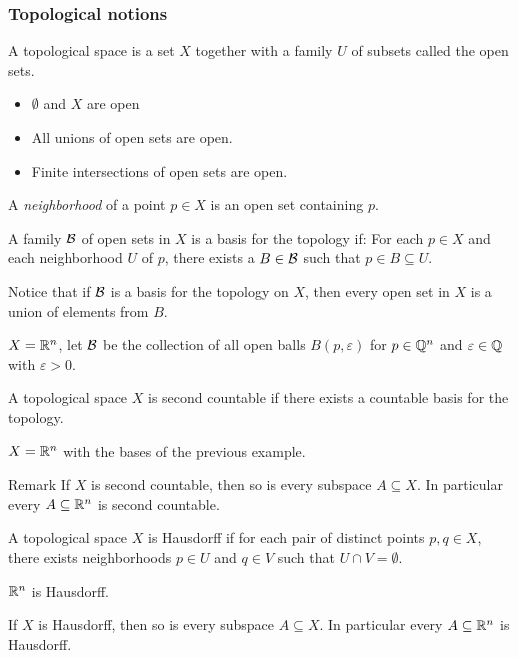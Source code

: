 \begin{frame}
  \frametitle{Topological notions}
  \begin{defn}
    A topological space is a set $X$ together with a family $U$
    of subsets called the open sets.
    \begin{itemize}
      \item $\emptyset$ and $X$ are open
      \item All unions of open sets are open.
      \item Finite intersections of open sets are open.
    \end{itemize}
  \end{defn}
  A {\em neighborhood} of a point $p \in X$ is an open set containing $p$.

  \begin{defn}
    A family $\mathcal B$
    of open sets in $X$ is a basis for the topology if: For each $p \in X$
    and each neighborhood $U$ of $p$, there exists a $B \in \mathcal B$
    such that $p \in B \subseteq U$.
  \end{defn}

  Notice that if $\mathcal B$ is a basis for the topology on $X$, then
  every open set in $X$ is a union of elements from $B$.
  \begin{example}
    $X = \mathbb R^n$, let $\mathcal B$ be the collection of all open balls
    $B(p, \varepsilon)$ for $p \in \mathbb Q^n$ and $\varepsilon \in \mathbb Q$
    with $\varepsilon > 0$.
  \end{example}
\end{frame}
\begin{frame}
  \begin{defn}
    A topological space $X$ is second countable if there
    exists a countable basis for the topology.
  \end{defn}
  \begin{example}
    $X = \mathbb R^n$ with the bases of the previous example.
  \end{example}
  \begin{block}
    {Remark}
    If $X$ is second countable, then so is every subspace $A \subseteq X$.
    In particular every $A \subseteq \mathbb R^n$ is second countable.
  \end{block}
\end{frame}
\begin{frame}
  \begin{defn}
    A topological space $X$ is Hausdorff if for each pair of distinct
    points $p, q \in X$, there 
    exists neighborhoods $p \in U$ and $q \in V$ such that $U \cap V =
    \emptyset$.
  \end{defn}
  \begin{example}
    $\mathbb R^n$ is Hausdorff.
  \end{example}
  \begin{remark}
    If $X$ is Hausdorff, then so is every subspace $A \subseteq X$.
    In particular every $A \subseteq \mathbb R^n$ is Hausdorff.
  \end{remark}
\end{frame}
